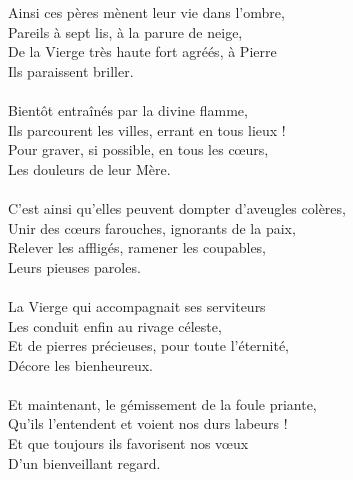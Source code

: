 Ainsi ces pères mènent leur vie dans l’ombre,\\
Pareils à sept lis, à la parure de neige,\\
De la Vierge très haute fort agréés, à Pierre\\
Ils paraissent briller.\\
\\
Bientôt entraînés par la divine flamme,\\
Ils parcourent les villes, errant en tous lieux !\\
Pour graver, si possible, en tous les cœurs,\\
Les douleurs de leur Mère.\\
\\
C’est ainsi qu’elles peuvent dompter d’aveugles colères,\\
Unir des cœurs farouches, ignorants de la paix,\\
Relever les affligés, ramener les coupables,\\
Leurs pieuses paroles.\\
\\
La Vierge qui accompagnait ses serviteurs\\
Les conduit enfin au rivage céleste,\\
Et de pierres précieuses, pour toute l’éternité,\\
Décore les bienheureux.\\
\\
Et maintenant, le gémissement de la foule priante,\\
Qu’ils l’entendent et voient nos durs labeurs !\\
Et que toujours ils favorisent nos vœux\\
D’un bienveillant regard.\\